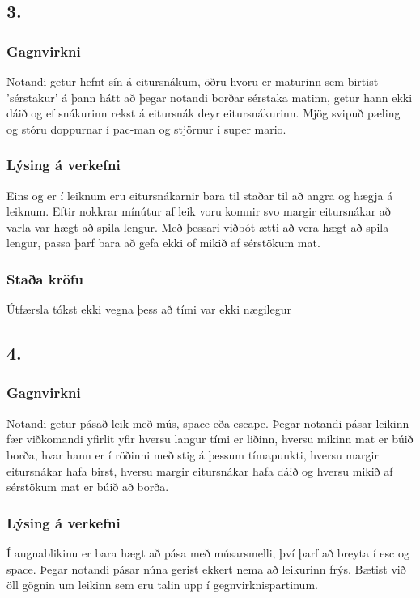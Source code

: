 \documentclass{article}
\begin{document}
\subsection*{3.}
\subsubsection*{Gagnvirkni}
Notandi getur hefnt sín á eitursnákum, öðru hvoru er maturinn sem birtist 'sérstakur'
á þann hátt að þegar notandi borðar sérstaka matinn, 
getur hann ekki dáið og ef snákurinn rekst á eitursnák deyr eitursnákurinn.
Mjög svipuð pæling og stóru doppurnar í pac-man og stjörnur í super mario.

\subsubsection*{Lýsing á verkefni}
Eins og er í leiknum eru eitursnákarnir bara til staðar til að angra og hægja á leiknum.
Eftir nokkrar mínútur af leik voru komnir svo margir eitursnákar að varla var hægt að spila lengur.
Með þessari viðbót ætti að vera hægt að spila lengur, passa þarf bara að gefa ekki of mikið af sérstökum mat.
\subsubsection*{Staða kröfu}
    Útfærsla tókst ekki vegna þess að tími var ekki nægilegur

\subsection*{4.}
\subsubsection*{Gagnvirkni}
Notandi getur pásað leik með mús, space eða escape. 
Þegar notandi pásar leikinn fær viðkomandi yfirlit yfir hversu langur tími er liðinn,
hversu mikinn mat er búið borða, hvar hann er í röðinni með stig á þessum tímapunkti, 
hversu margir eitursnákar hafa birst, hversu margir eitursnákar hafa dáið og hversu mikið af sérstökum mat er búið að borða.

\subsubsection*{Lýsing á verkefni}
Í augnablikinu er bara hægt að pása með músarsmelli, því þarf að breyta í esc og space. 
Þegar notandi pásar núna gerist ekkert nema að leikurinn frýs. Bætist við öll gögnin um leikinn sem eru talin upp í gegnvirknispartinum.
\end{document}
